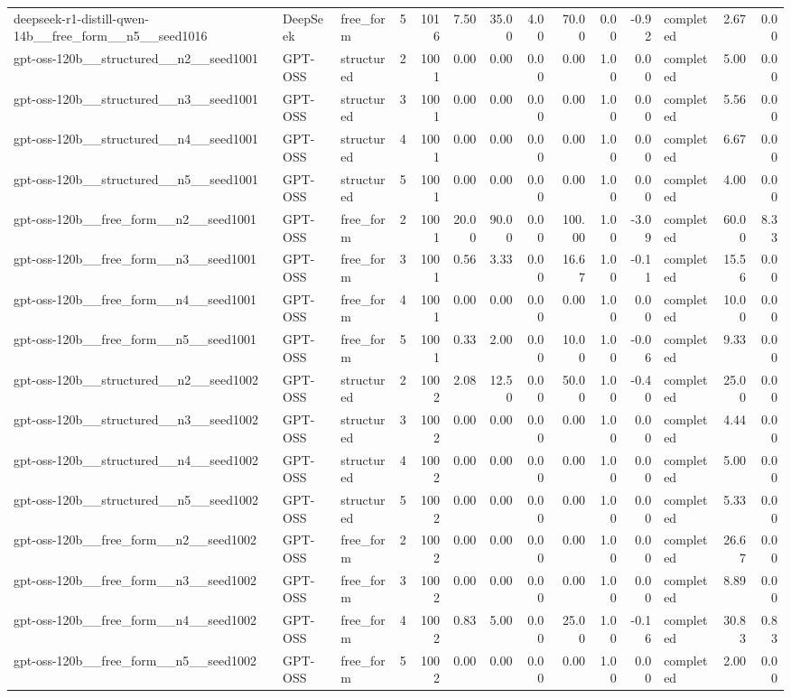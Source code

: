 \begin{longtable}{lllrrrrrrrrlrr}
deepseek-r1-distill-qwen-14b\_\_free\_form\_\_n5\_\_seed1016 & DeepSeek & free\_form & 5 & 1016 & 7.50 & 35.00 & 4.00 & 70.00 & 0.00 & -0.92 & completed & 2.67 & 0.00 \\
gpt-oss-120b\_\_structured\_\_n2\_\_seed1001 & GPT-OSS & structured & 2 & 1001 & 0.00 & 0.00 & 0.00 & 0.00 & 1.00 & 0.00 & completed & 5.00 & 0.00 \\
gpt-oss-120b\_\_structured\_\_n3\_\_seed1001 & GPT-OSS & structured & 3 & 1001 & 0.00 & 0.00 & 0.00 & 0.00 & 1.00 & 0.00 & completed & 5.56 & 0.00 \\
gpt-oss-120b\_\_structured\_\_n4\_\_seed1001 & GPT-OSS & structured & 4 & 1001 & 0.00 & 0.00 & 0.00 & 0.00 & 1.00 & 0.00 & completed & 6.67 & 0.00 \\
gpt-oss-120b\_\_structured\_\_n5\_\_seed1001 & GPT-OSS & structured & 5 & 1001 & 0.00 & 0.00 & 0.00 & 0.00 & 1.00 & 0.00 & completed & 4.00 & 0.00 \\
gpt-oss-120b\_\_free\_form\_\_n2\_\_seed1001 & GPT-OSS & free\_form & 2 & 1001 & 20.00 & 90.00 & 0.00 & 100.00 & 1.00 & -3.09 & completed & 60.00 & 8.33 \\
gpt-oss-120b\_\_free\_form\_\_n3\_\_seed1001 & GPT-OSS & free\_form & 3 & 1001 & 0.56 & 3.33 & 0.00 & 16.67 & 1.00 & -0.11 & completed & 15.56 & 0.00 \\
gpt-oss-120b\_\_free\_form\_\_n4\_\_seed1001 & GPT-OSS & free\_form & 4 & 1001 & 0.00 & 0.00 & 0.00 & 0.00 & 1.00 & 0.00 & completed & 10.00 & 0.00 \\
gpt-oss-120b\_\_free\_form\_\_n5\_\_seed1001 & GPT-OSS & free\_form & 5 & 1001 & 0.33 & 2.00 & 0.00 & 10.00 & 1.00 & -0.06 & completed & 9.33 & 0.00 \\
gpt-oss-120b\_\_structured\_\_n2\_\_seed1002 & GPT-OSS & structured & 2 & 1002 & 2.08 & 12.50 & 0.00 & 50.00 & 1.00 & -0.40 & completed & 25.00 & 0.00 \\
gpt-oss-120b\_\_structured\_\_n3\_\_seed1002 & GPT-OSS & structured & 3 & 1002 & 0.00 & 0.00 & 0.00 & 0.00 & 1.00 & 0.00 & completed & 4.44 & 0.00 \\
gpt-oss-120b\_\_structured\_\_n4\_\_seed1002 & GPT-OSS & structured & 4 & 1002 & 0.00 & 0.00 & 0.00 & 0.00 & 1.00 & 0.00 & completed & 5.00 & 0.00 \\
gpt-oss-120b\_\_structured\_\_n5\_\_seed1002 & GPT-OSS & structured & 5 & 1002 & 0.00 & 0.00 & 0.00 & 0.00 & 1.00 & 0.00 & completed & 5.33 & 0.00 \\
gpt-oss-120b\_\_free\_form\_\_n2\_\_seed1002 & GPT-OSS & free\_form & 2 & 1002 & 0.00 & 0.00 & 0.00 & 0.00 & 1.00 & 0.00 & completed & 26.67 & 0.00 \\
gpt-oss-120b\_\_free\_form\_\_n3\_\_seed1002 & GPT-OSS & free\_form & 3 & 1002 & 0.00 & 0.00 & 0.00 & 0.00 & 1.00 & 0.00 & completed & 8.89 & 0.00 \\
gpt-oss-120b\_\_free\_form\_\_n4\_\_seed1002 & GPT-OSS & free\_form & 4 & 1002 & 0.83 & 5.00 & 0.00 & 25.00 & 1.00 & -0.16 & completed & 30.83 & 0.83 \\
gpt-oss-120b\_\_free\_form\_\_n5\_\_seed1002 & GPT-OSS & free\_form & 5 & 1002 & 0.00 & 0.00 & 0.00 & 0.00 & 1.00 & 0.00 & completed & 2.00 & 0.00 \\
\end{longtable}
